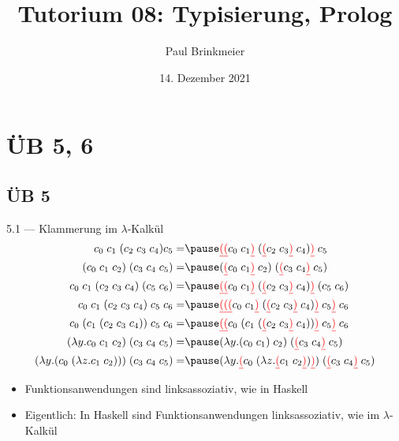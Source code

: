 \documentclass{beamer}
\title{Tutorium 08: Typisierung, Prolog}
\author{Paul Brinkmeier}
\institute{Tutorium Programmierparadigmen am KIT}
\date{14. Dezember 2021}
\begin{document}
\begin{frame}
    \titlepage
\end{frame}

\section{ÜB 5, 6}

\subsection{ÜB 5}

\newcommand{\E}{\;}

\newcommand{\liin}[2]{#1\E{}#2}
\newcommand{\liiin}[3]{#1\E{}#2\E{}#3}
\newcommand{\livn}[4]{#1\E{}#2\E{}#3\E{}#4}
\newcommand{\lvn}[5]{#1\E{}#2\E{}#3\E{}#4\E{}#5}

\newcommand{\lii}[2]{(#1\E{}#2)}
\newcommand{\liii}[3]{(#1\E{}#2\E{}#3)}

\newcommand{\liir}[2]{\textcolor{red}{\underline{(}}#1\E{}#2\textcolor{red}{\underline{)}}}
\newcommand{\liiir}[3]{\textcolor{red}{\underline{(}}#1\E{}#2\E{}#3\textcolor{red}{\underline{)}}}

\newcommand{\abs}[2]{\lambda{}#1.#2}

\begin{frame}{5.1 --- Klammerung im $\lambda$-Kalkül}
	\footnotesize
	\begin{eqnarray}
		\liiin{c_0}{c_1}{\liii{c_2}{c_3}{c_4}}{c_5}                   =& \pause \liin{\liir{\liir{c_0}{c_1}}{\lii{\liir{c_2}{c_3}}{c_4}}}{c_5}             \\
		\liin{\liii{c_0}{c_1}{c_2}}{\liii{c_3}{c_4}{c_5}}             =& \pause \liin{\lii{\liir{c_0}{c_1}}{c_2}}{\lii{\liir{c_3}{c_4}}{c_5}}              \\
		\livn{c_0}{c_1}{\liii{c_2}{c_3}{c_4}}{\lii{c_5}{c_6}}         =& \pause \liin{\liir{\liir{c_0}{c_1}}{\lii{\liir{c_2}{c_3}}{c_4}}}{\lii{c_5}{c_6}}  \\
		\lvn{c_0}{c_1}{\liii{c_2}{c_3}{c_4}}{c_5}{c_6}                =& \pause \liin{\liir{\liir{\liir{c_0}{c_1}}{\lii{\liir{c_2}{c_3}}{c_4}}}{c_5}}{c_6} \\
		\livn{c_0}{\lii{c_1}{\liii{c_2}{c_3}{c_4}}}{c_5}{c_6}         =& \pause \liin{\liir{\liir{c_0}{\lii{c_1}{\lii{\liir{c_2}{c_3}}{c_4}}}}{c_5}}{c_6}  \\
		\liin{(\abs{y}{\liiin{c_0}{c_1}{c_2}})}{\liii{c_3}{c_4}{c_5}} =& \pause \liin{(\abs{y}{\liin{\lii{c_0}{c_1}}{c_2}})}{\lii{\liir{c_3}{c_4}}{c_5}}  \\
                \liin{(\abs{y}{\lii{c_0}{(\abs{z}{\liin{c_1}{c_2}})}})}{\liii{c_3}{c_4}{c_5}} =& \pause \liin{(\abs{y}{\liir{c_0}{(\abs{z}{\liir{c_1}{c_2}})}})}{\lii{\liir{c_3}{c_4}}{c_5}}
	\end{eqnarray}

	\normalsize
	\begin{itemize}
		\item Funktionsanwendungen sind linksassoziativ, wie in Haskell
		\item Eigentlich: In Haskell sind Funktionsanwendungen linksassoziativ, wie im $\lambda$-Kalkül
	\end{itemize}
\end{frame}
\end{document}
